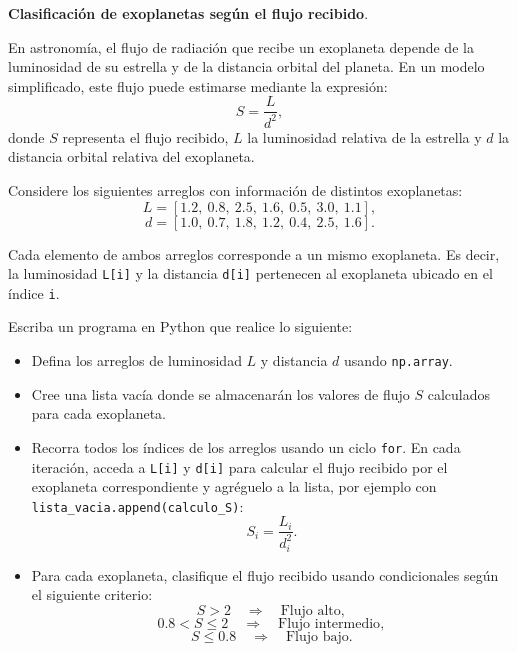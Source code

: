 \providecommand{\Needspace}[1]{}
\Needspace{8\baselineskip}
\item \textbf{Clasificación de exoplanetas según el flujo recibido}.
\nopagebreak[4]

\begin{tcolorbox}[colback=blue!2!white,colframe=blue!55!black,title={Enunciado},breakable]
En astronomía, el flujo de radiación que recibe un exoplaneta depende de la luminosidad de su estrella y de la distancia orbital del planeta. En un modelo simplificado, este flujo puede estimarse mediante la expresión:
\[
S = \frac{L}{d^2},
\]
donde $S$ representa el flujo recibido, $L$ la luminosidad relativa de la estrella y $d$ la distancia orbital relativa del exoplaneta.

Considere los siguientes arreglos con información de distintos exoplanetas:
\[
L = [1.2,\ 0.8,\ 2.5,\ 1.6,\ 0.5,\ 3.0,\ 1.1],
\]
\[
d = [1.0,\ 0.7,\ 1.8,\ 1.2,\ 0.4,\ 2.5,\ 1.6].
\]

Cada elemento de ambos arreglos corresponde a un mismo exoplaneta. Es decir, la luminosidad \texttt{L[i]} y la distancia \texttt{d[i]} pertenecen al exoplaneta ubicado en el índice \texttt{i}.

Escriba un programa en Python que realice lo siguiente:

\begin{itemize}
    \item[(a)] Defina los arreglos de luminosidad $L$ y distancia $d$ usando \texttt{np.array}.

    \item[(b)] Cree una lista vacía donde se almacenarán los valores de flujo $S$ calculados para cada exoplaneta.

    \item[(c)] Recorra todos los índices de los arreglos usando un ciclo \texttt{for}. En cada iteración, acceda a \texttt{L[i]} y \texttt{d[i]} para calcular el flujo recibido por el exoplaneta correspondiente y agréguelo a la lista, por ejemplo con \texttt{lista\_vacia.append(calculo\_S)}:
    \[
    S_i = \frac{L_i}{d_i^2}.
    \]

    \item[(d)] Para cada exoplaneta, clasifique el flujo recibido usando condicionales según el siguiente criterio:
    \[
    S > 2 \quad \Longrightarrow \quad \text{Flujo alto},
    \]
    \[
    0.8 < S \leq 2 \quad \Longrightarrow \quad \text{Flujo intermedio},
    \]
    \[
    S \leq 0.8 \quad \Longrightarrow \quad \text{Flujo bajo}.
    \]


\end{itemize}
\end{tcolorbox}
